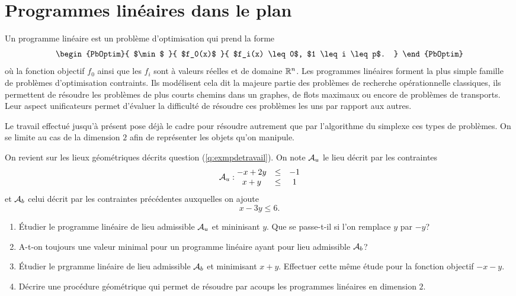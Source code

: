 \documentclass[11pt, a4paper]{article}
\begin{document}
\section{Programmes linéaires dans le plan}
\label{sec:proglinplan}

Un programme linéaire est un problème d'optimisation qui prend la
forme
\[
\begin{PbOptim}{
    $\min$
  }{
    $f_0(x)$
  }{
    $f_i(x) \leq 0$, $1 \leq i \leq p$.
  }
\end{PbOptim}
\]
où la fonction objectif $f_0$ ainsi que les $f_i$ sont à valeurs
réelles et de domaine $\mathbb{R}^n$. Les programmes linéaires forment la plus
simple famille de problèmes d'optimisation contraints. Ils modélisent
cela dit la majeure partie des problèmes de recherche opérationnelle
classiques, ils permettent de résoudre les problèmes de plus courts
chemins dans un graphes, de flots maximaux ou encore de problèmes de
transports. Leur aspect unificateurs permet d'évaluer la difficulté de
résoudre ces problèmes les uns par rapport aux autres.

Le travail effectué jusqu'à présent pose déjà le cadre pour résoudre
autrement que par l'algorithme du simplexe ces types de problèmes. On
se limite au cas de la dimension $2$ afin de représenter les objets
qu'on manipule.

\begin{question}
  On revient sur les lieux géométriques décrits question
  (\ref{q:exmpdetravail}). On note $\mathcal{A}_u$ le lieu décrit par les
  contraintes
  \[
    \mathcal{A}_u : \begin{matrix}
      -x + 2 y & \leq & -1 \\
      x + y & \leq & 1
    \end{matrix}
  \]
  et $\mathcal{A}_b$ celui décrit par les contraintes précédentes
  auxquelles on ajoute
  \[
    x - 3y \leq 6.
  \]
  \begin{enumerate}
  \item Étudier le programme linéaire de lieu admissible $\mathcal{A}_u$ et
    mininisant $y$. Que se passe-t-il si l'on remplace $y$ par $-y$?
  \item A-t-on toujours une valeur minimal pour un programme linéaire
    ayant pour lieu admissible $\mathcal{A}_b$?
  \item Étudier le prgramme linéaire de lieu admissible $\mathcal{A}_b$ et
    minimisant $x + y$. Effectuer cette même étude pour la fonction
    objectif $-x-y$.
  \item Décrire une procédure géométrique qui permet de résoudre par
    acoups les programmes linéaires en dimension $2$.
  \end{enumerate}
\end{question}
\end{document}
